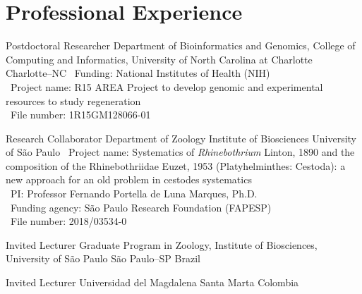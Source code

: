 
\section{Professional Experience}

	{Postdoctoral Researcher}
	{Department of Bioinformatics and Genomics, College of Computing and Informatics, University of North Carolina at Charlotte}
	{Charlotte--NC}
	{}
	{
		\textbullet~Funding: National Institutes of Health (NIH)\\
		\textbullet~Project name: R15 AREA Project to develop genomic and experimental resources to study regeneration\\
		\textbullet~File number: 1R15GM128066-01
	}

	{Research Collaborator}
	{Department of Zoology}
	{Institute of Biosciences}
	{University of São Paulo}
	{
		\textbullet~Project name: Systematics of \emph{Rhinebothrium} Linton, 1890 and the composition of the Rhinebothriidae Euzet, 1953 (Platyhelminthes: Cestoda): a new approach for an old problem in cestodes systematics\\
		\textbullet~PI: Professor Fernando Portella de Luna Marques, Ph.D.\\
		\textbullet~Funding agency: São Paulo Research Foundation (FAPESP)\\
		\textbullet~File number: 2018/03534-0
	}

	{Invited Lecturer}
	{Graduate Program in Zoology, Institute of Biosciences, University of São Paulo}
	{São Paulo--SP}
	{Brazil}
	{}

	{Invited Lecturer}
	{Universidad del Magdalena}
	{Santa Marta}
	{Colombia}
	{}




